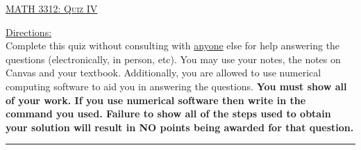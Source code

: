\documentclass[10pt, a4paper]{article}
\theoremstyle{break}
\begin{document}
\begin{center}
{\large \textsc{\underline{MATH 3312: Quiz IV}}}
\vspace{0.125in}
\end{center}
\underline{Directions:} \\
Complete this quiz without consulting with \underline{anyone} else for help answering the questions (electronically, in person, etc). You may use your notes, the notes on Canvas and your textbook. Additionally, you are allowed to use numerical computing software to aid you in answering the questions. \textbf{You must show all of your work. If you use numerical software then write in the command you used. Failure to show all of the steps used to obtain your solution will result in NO points being awarded for that question. }  \\
\noindent\rule{15cm}{0.4pt}

\vspace{0.25in}
\end{document}
